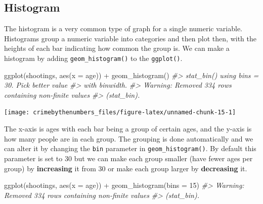 \documentclass[
]{krantz}
\makeatletter
\newenvironment{Shaded}{\begin{snugshade}}{\end{snugshade}}
\newcommand{\AttributeTok}[1]{\textcolor[rgb]{0.61,0.61,0.61}{#1}}
\newcommand{\CommentTok}[1]{\textcolor[rgb]{0.37,0.37,0.37}{\textit{#1}}}
\newcommand{\DecValTok}[1]{\textcolor[rgb]{0.06,0.06,0.06}{#1}}
\newcommand{\FunctionTok}[1]{\textcolor[rgb]{0,0,0}{#1}}
\newcommand{\NormalTok}[1]{#1}
\newcommand{\SpecialCharTok}[1]{\textcolor[rgb]{0,0,0}{#1}}
\newenvironment{kframe}{%
\medskip{}
\setlength{\fboxsep}{.8em}
 \def\at@end@of@kframe{}%
 \ifinner\ifhmode%
  \def\at@end@of@kframe{\end{minipage}}%
  \begin{minipage}{\columnwidth}%
 \fi\fi%
 \def\FrameCommand##1{\hskip\@totalleftmargin \hskip-\fboxsep
 \colorbox{shadecolor}{##1}\hskip-\fboxsep
     \hskip-\linewidth \hskip-\@totalleftmargin \hskip\columnwidth}%
 \MakeFramed {\advance\hsize-\width
   \@totalleftmargin\z@ \linewidth\hsize
   \@setminipage}}%
 {\par\unskip\endMakeFramed%
 \at@end@of@kframe}
\renewenvironment{Shaded}{\begin{kframe}}{\end{kframe}}
\makeatother
\begin{document}
\hypertarget{histogram}{%
\subsection{Histogram}\label{histogram}}

The histogram is a very common type of graph for a single numeric variable. Histograms group a numeric variable into categories and then plot then, with the heights of each bar indicating how common the group is. We can make a histogram by adding \texttt{geom\_histogram()} to the \texttt{ggplot()}.

\begin{Shaded}
\begin{Highlighting}[]
\FunctionTok{ggplot}\NormalTok{(shootings, }\FunctionTok{aes}\NormalTok{(}\AttributeTok{x =}\NormalTok{ age)) }\SpecialCharTok{+} \FunctionTok{geom\_histogram}\NormalTok{()}
\CommentTok{\#\textgreater{} \textasciigrave{}stat\_bin()\textasciigrave{} using \textasciigrave{}bins = 30\textasciigrave{}. Pick better value}
\CommentTok{\#\textgreater{} with \textasciigrave{}binwidth\textasciigrave{}.}
\CommentTok{\#\textgreater{} Warning: Removed 334 rows containing non{-}finite values}
\CommentTok{\#\textgreater{} (stat\_bin).}
\end{Highlighting}
\end{Shaded}

\begin{center}\texttt{[image: crimebythenumbers\_files/figure-latex/unnamed-chunk-15-1]} \end{center}

The x-axis is ages with each bar being a group of certain ages, and the y-axis is how many people are in each group. The grouping is done automatically and we can alter it by changing the \texttt{bin} parameter in \texttt{geom\_histogram()}. By default this parameter is set to 30 but we can make each group smaller (have fewer ages per group) by \textbf{increasing} it from 30 or make each group larger by \textbf{decreasing} it.

\begin{Shaded}
\begin{Highlighting}[]
\FunctionTok{ggplot}\NormalTok{(shootings, }\FunctionTok{aes}\NormalTok{(}\AttributeTok{x =}\NormalTok{ age)) }\SpecialCharTok{+} \FunctionTok{geom\_histogram}\NormalTok{(}\AttributeTok{bins =} \DecValTok{15}\NormalTok{)}
\CommentTok{\#\textgreater{} Warning: Removed 334 rows containing non{-}finite values}
\CommentTok{\#\textgreater{} (stat\_bin).}
\end{Highlighting}
\end{Shaded}
\end{document}
